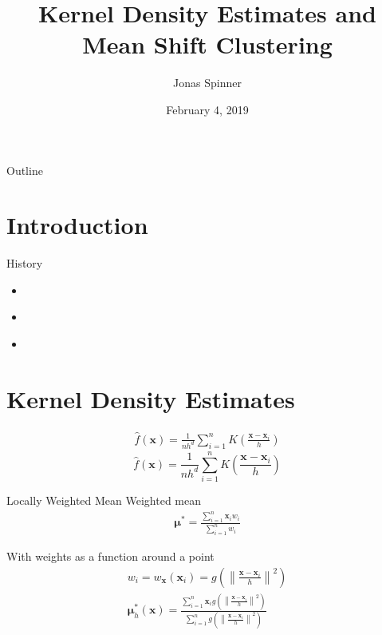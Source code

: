 \documentclass[18pt]{beamer}
\title[KDE and MSC]{Kernel Density Estimates and Mean Shift Clustering}
\author{Jonas Spinner}
\date{February 4, 2019}
\institute{Analytics and Statistics at the Institute of Operations Research}
\newcommand{\norm}[1]{\left\lVert#1\right\rVert}
\begin{document}

\begin{frame}
\titlepage
\end{frame}

\begin{frame}{Outline}
	\tableofcontents
\end{frame}


\section{Introduction}
\begin{frame}{History}
	\begin{itemize}
		\item \cite{Fukunaga.1975}
		\item \cite{Comaniciu.2002}
		\item \cite{Comaniciu.2003}
	\end{itemize}
\end{frame}


\section{Kernel Density Estimates}
\begin{frame}
	\begin{align*}
		\hat{f}(\bm{x}) = \frac{1}{n h^d} \sum_{i=1}^{n} K\left(\frac{\bm{x} - \bm{x}_i}{h} \right)
	\end{align*}
	\[ \hat{f}(\bm{x}) = \frac{1}{n h^d} \sum_{i=1}^{n} K\left(\frac{\bm{x} - \bm{x}_i}{h} \right) \]
\end{frame}


\begin{frame}{Locally Weighted Mean}
	Weighted mean
	\begin{align*}
		\bm{\mu}^* = \frac{\sum_{i=1}^n \bm{x}_i w_i}{\sum_{i=1}^n w_i}
	\end{align*}
	
	With weights as a function around a point
	\begin{align*}
		w_i = w_{\bm{x}}(\bm{x}_i) = g\left(\norm{\frac{\bm{x} - \bm{x}_i}{h}}^2 \right)\\
		\bm{\mu}_h^*(\bm{x}) = \frac{\sum_{i=1}^n \bm{x}_i g\left(\norm{\frac{\bm{x} - \bm{x}_i}{h}}^2 \right)}{\sum_{i=1}^n g\left(\norm{\frac{\bm{x} - \bm{x}_i}{h}}^2 \right)}
	\end{align*}
\end{frame}
\end{document}
